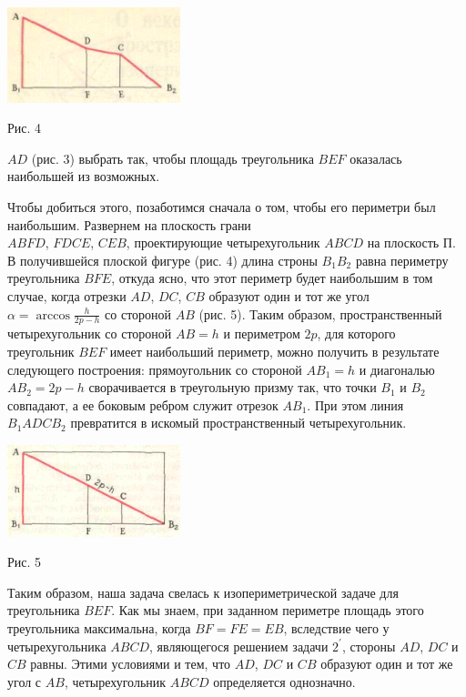 \twocolumn
\begin{center}
\includegraphics[width=190px]{pic1.png}
\end{center}

\noindent Рис. 4
\newline


\par \noindent $AD$ (рис. 3) выбрать так, чтобы площадь треугольника $BEF$ оказалась наибольшей из возможных.


\par Чтобы добиться этого, позаботимся сначала о том, чтобы его периметри был наибольшим. Развернем на плоскость грани\\ $ABFD$, $FDCE$, $CEB$, проектирующие четырехугольник $ABCD$ на плоскость П. В получившейся плоской фигуре (рис. 4) длина строны $B_{1}B_{2}$ равна периметру треугольника $BFE$, откуда ясно, что этот периметр будет наибольшим в том случае, когда отрезки $AD$, $DC$, $CB$ образуют один и тот же угол $\alpha = \arccos{\frac{h}{2p-h}}$ со стороной $AB$ (рис. 5). Таким образом, пространственный четырехугольник со стороной $AB = h$ и периметром $2p$, для которого треугольник $BEF$ имеет наибольший периметр, можно получить в результате следующего построения: прямоугольник со стороной $AB_{1} = h$ и диагональю $AB_{2} = 2p - h$ сворачивается в треугольную призму так, что точки $B_{1}$ и $B_{2}$ совпадают, а ее боковым ребром служит отрезок $AB_{1}$. При этом линия $B_{1}ADCB_{2}$ превратится в искомый пространственный четырехугольник.


\begin{center}
\includegraphics[width=190px]{pic2.png}
\end{center}
\noindent Рис. 5
\pagebreak

\par Таким образом, наша задача свелась к изопериметрической задаче для треугольника $BEF$. Как мы знаем, при заданном периметре  площадь этого треугольника максимальна, когда $BF = FE = EB$, вследствие чего у четырехугольника $ABCD$, являющегося решением задачи $2^\prime$, стороны $AD$, $DC$ и $CB$ равны. Этими условиями и тем, что $AD$, $DC$ и $CB$ образуют один и тот же угол с $AB$, четырехугольник $ABCD$ определяется однозначно.

